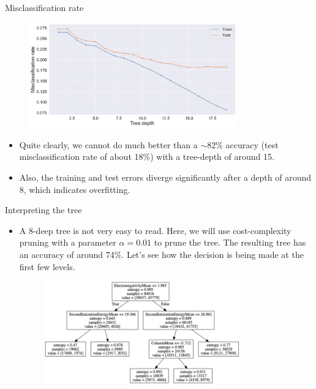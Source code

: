 \documentclass{beamer}
\begin{document}
\begin{frame}{Misclassification rate}
    \begin{figure}
        \centering
        \includegraphics[width=0.8\textwidth]{figures/misclassfication_rate_metal_insulator.png}
    \end{figure}
    \begin{itemize}
        \item Quite clearly, we cannot do much better than a $\sim 82\%$ accuracy (test misclassification rate of about 18\%) with a tree-depth of around 15.
        \item Also, the training and test errors diverge significantly after a depth of around 8, which indicates overfitting.
    \end{itemize}
\end{frame}


\begin{frame}{Interpreting the tree}
    \begin{itemize}
        \item A 8-deep tree is not very easy to read. Here, we will use cost-complexity pruning with a parameter $\alpha = 0.01$ to prune the tree. The resulting tree has an accuracy of around 74\%. Let's see how the decision is being made at the first few levels.
        \begin{figure}
            \centering
            \includegraphics[width=0.8\textwidth]{figures/metal_insulator_tree.png}
        \end{figure}
    \end{itemize}
\end{frame}
\end{document}
